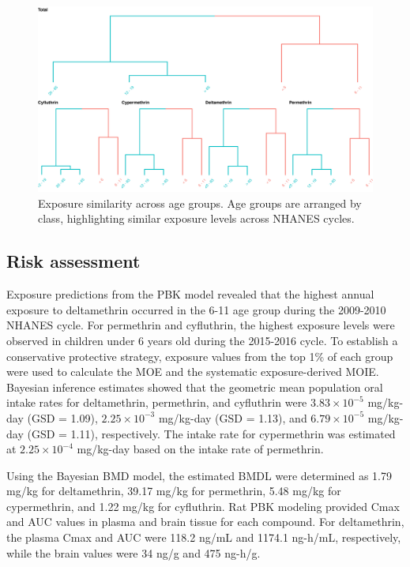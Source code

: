 \documentclass[toxics,article,submit,pdftex,moreauthors]{Definitions/mdpi}
\begin{document}
\begin{figure}[H]
\centering
\begin{adjustwidth}{-2cm}{}
\centering
\includegraphics[width=\linewidth]{figures/fig7}
\hfill
\end{adjustwidth}
\caption{Exposure similarity across age groups. Age groups are arranged by
class, highlighting similar exposure levels across NHANES cycles.\label{fig:fig7}}
\end{figure}

\subsection{Risk assessment}\label{risk-assessment}

Exposure predictions from the PBK model revealed that the highest annual
exposure to deltamethrin occurred in the 6-11 age group during the 2009-2010
NHANES cycle. For permethrin and cyfluthrin, the highest exposure levels were
observed in children under 6 years old during the 2015-2016 cycle. To establish
a conservative protective strategy, exposure values from the top 1\% of each
group were used to calculate the MOE and the systematic exposure-derived MOIE.
Bayesian inference estimates showed that the geometric mean population oral
intake rates for deltamethrin, permethrin, and cyfluthrin were \(3.83 \times
10^{-5}\) mg/kg-day (GSD = 1.09), \(2.25 \times 10^{-3}\) mg/kg-day (GSD =
1.13), and \(6.79 \times 10^{-5}\) mg/kg-day (GSD = 1.11), respectively. The
intake rate for cypermethrin was estimated at \(2.25 \times 10^{-4}\) mg/kg-day
based on the intake rate of permethrin.

Using the Bayesian BMD model, the estimated BMDL were determined as 1.79 mg/kg for deltamethrin,
39.17 mg/kg for permethrin, 5.48 mg/kg for cypermethrin, and 1.22 mg/kg
for cyfluthrin. Rat PBK modeling provided Cmax and AUC values in plasma
and brain tissue for each compound. For deltamethrin, the plasma Cmax
and AUC were 118.2 ng/mL and 1174.1 ng-h/mL, respectively, while the
brain values were 34 ng/g and 475 ng-h/g.
\end{document}

